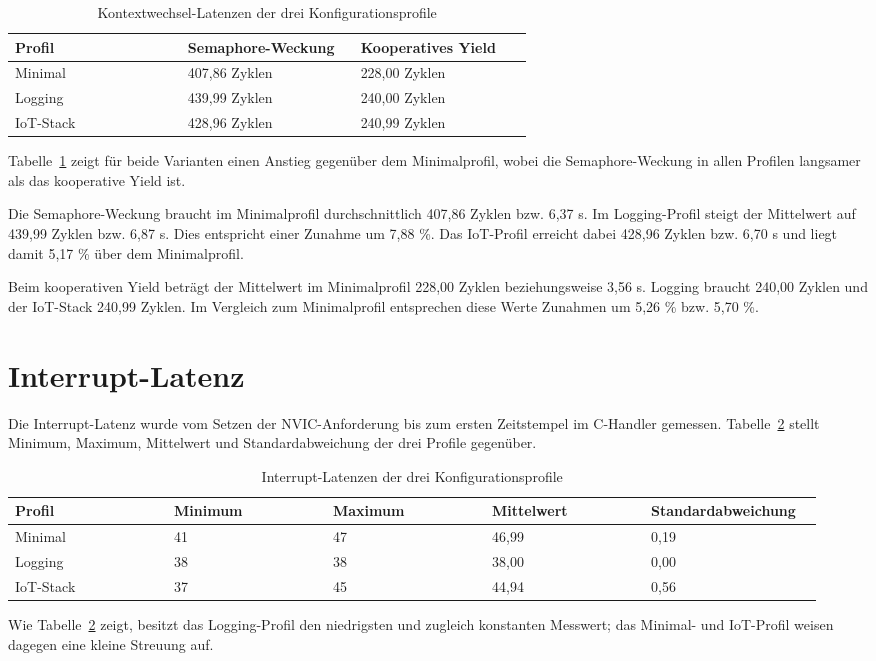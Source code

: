 \begin{longtable}{p{0.313\linewidth}p{0.313\linewidth}p{0.313\linewidth}}
\caption{Kontextwechsel-Latenzen der drei Konfigurationsprofile}\label{tab:kontextwechsel-profile}\\
\toprule
\textbf{Profil} & \textbf{Semaphore-Weckung} & \textbf{Kooperatives Yield} \\
\midrule
Minimal & 407,86 Zyklen & 228,00 Zyklen \\
Logging & 439,99 Zyklen & 240,00 Zyklen \\
IoT-Stack & 428,96 Zyklen & 240,99 Zyklen \\
\bottomrule
\end{longtable}

Tabelle~\ref{tab:kontextwechsel-profile} zeigt f{\"u}r beide Varianten einen Anstieg gegen{\"u}ber dem Minimalprofil, wobei die Semaphore-Weckung in allen Profilen langsamer als das kooperative Yield ist.

Die Semaphore-Weckung braucht im Minimalprofil durchschnittlich 407,86 Zyklen bzw. 6,37 \textmu{}s. Im Logging-Profil steigt der Mittelwert auf 439,99 Zyklen bzw. 6,87 \textmu{}s. Dies entspricht einer Zunahme um 7,88 \%. Das IoT-Profil erreicht dabei 428,96 Zyklen bzw. 6,70 \textmu{}s und liegt damit 5,17 \% {\"u}ber dem Minimalprofil.

Beim kooperativen Yield betr{\"a}gt der Mittelwert im Minimalprofil 228,00 Zyklen beziehungsweise 3,56 \textmu{}s. Logging braucht 240,00 Zyklen und der IoT-Stack 240,99 Zyklen. Im Vergleich zum Minimalprofil entsprechen diese Werte Zunahmen um 5,26 \% bzw. 5,70 \%.

\section{Interrupt-Latenz}
Die Interrupt-Latenz wurde vom Setzen der NVIC-Anforderung bis zum ersten Zeitstempel im C-Handler gemessen. Tabelle~\ref{tab:interrupt-profile} stellt Minimum, Maximum, Mittelwert und Standardabweichung der drei Profile gegen{\"u}ber.

\begin{longtable}{p{0.188\linewidth}p{0.188\linewidth}p{0.188\linewidth}p{0.188\linewidth}p{0.188\linewidth}}
\caption{Interrupt-Latenzen der drei Konfigurationsprofile}\label{tab:interrupt-profile}\\
\toprule
\textbf{Profil} & \textbf{Minimum} & \textbf{Maximum} & \textbf{Mittelwert} & \textbf{Standardabweichung} \\
\midrule
Minimal & 41 & 47 & 46,99 & 0,19 \\
Logging & 38 & 38 & 38,00 & 0,00 \\
IoT-Stack & 37 & 45 & 44,94 & 0,56 \\
\bottomrule
\end{longtable}
Wie Tabelle~\ref{tab:interrupt-profile} zeigt, besitzt das Logging-Profil den niedrigsten und zugleich konstanten Messwert; das Minimal- und IoT-Profil weisen dagegen eine kleine Streuung auf.

